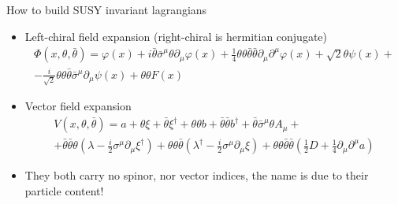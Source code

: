 \documentclass[10pt]{beamer}
\begin{document}
\begin{frame}{How to build SUSY invariant lagrangians}
    \begin{itemize} 
        \item Left-chiral field expansion (right-chiral is hermitian conjugate)
            \begin{gather*}
                \Phi(x, \theta, \bar\theta) = \varphi(x) + i\bar\theta \bar\sigma^{\mu}\theta \partial_{\mu}\varphi(x) + \frac{1}{4}\theta\theta\bar\theta\bar\theta\partial_{\mu}\partial^{\mu}\varphi(x) + \sqrt{2}\theta\psi(x) + \\ 
                -\frac{i}{\sqrt{2}}\theta\theta\bar\theta\bar\sigma^{\mu}\partial_{\mu}\psi(x) + \theta\theta F(x)
            \end{gather*}
        \item Vector field expansion
            \begin{gather*}
                V\left(x, \theta, \bar\theta\right) = a+\theta \xi+\bar\theta \xi^{\dagger} +\theta \theta b+\bar\theta \bar\theta b^{\dagger}+\bar\theta \bar{\sigma}^{\mu} \theta A_{\mu}+ \\ 
                + \bar\theta \bar\theta \theta\left(\lambda-\frac{i}{2} \sigma^{\mu} \partial_{\mu} \xi^{\dagger}\right)
                +\theta \theta \bar\theta\left(\lambda^{\dagger}-\frac{i}{2} \sigma^{\mu} \partial_{\mu} \xi\right)+\theta \theta \bar\theta \bar\theta \left(\frac{1}{2} D+\frac{1}{4} \partial_{\mu} \partial^{\mu} a\right)
            \end{gather*}
        \item They both carry no spinor, nor vector indices, the name is due to their particle content! 
    \end{itemize}
\end{frame}
\end{document}
